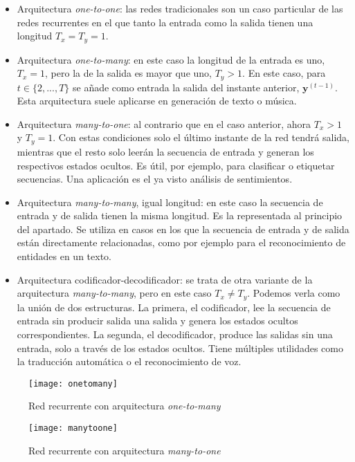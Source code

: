 \begin{itemize}
\item Arquitectura \textit{one-to-one}: las redes tradicionales son un caso particular de las redes recurrentes en el que tanto la entrada como la salida tienen una longitud $T_x = T_y = 1$.
\item Arquitectura \textit{one-to-many}: en este caso la longitud de la entrada es uno, $T_x = 1$, pero la de la salida es mayor que uno, $T_y > 1$. En este caso, para $t \in \{2,...,T\}$ se añade como entrada la salida del instante anterior, $\textbf{y}^{(t-1)}$. Esta arquitectura suele aplicarse en generación de texto o música.
\item Arquitectura \textit{many-to-one}: al contrario que en el caso anterior, ahora $T_x > 1$ y $T_y = 1$. Con estas condiciones solo el último instante de la red tendrá salida, mientras que el resto solo leerán la secuencia de entrada y generan los respectivos estados ocultos. Es útil, por ejemplo, para clasificar o etiquetar secuencias. Una aplicación es el ya visto análisis de sentimientos.
\item Arquitectura \textit{many-to-many}, igual longitud: en este caso la secuencia de entrada y de salida tienen la misma longitud. Es la representada al principio del apartado. Se utiliza en casos en los que la secuencia de entrada y de salida están directamente relacionadas, como por ejemplo para el reconocimiento de entidades en un texto.
\item Arquitectura codificador-decodificador: se trata de otra variante de la arquitectura \textit{many-to-many}, pero en este caso $T_x \neq T_y$. Podemos verla como la unión de dos estructuras. La primera, el codificador, lee la secuencia de entrada sin producir salida una salida y genera los estados ocultos correspondientes. La segunda, el decodificador, produce las salidas sin una entrada, solo a través de los estados ocultos. Tiene múltiples utilidades como la traducción automática o el reconocimiento de voz.

\end{itemize}

\begin{figure}[htpb]
  \centering
  \texttt{[image: onetomany]}
  \caption{Red recurrente con arquitectura \textit{one-to-many}}
  \label{fig:onetomany}
\end{figure}

\begin{figure}[htpb]
\centering
\texttt{[image: manytoone]}
\caption{Red recurrente con arquitectura \textit{many-to-one}}
\label{fig:manytoone}
\end{figure}


